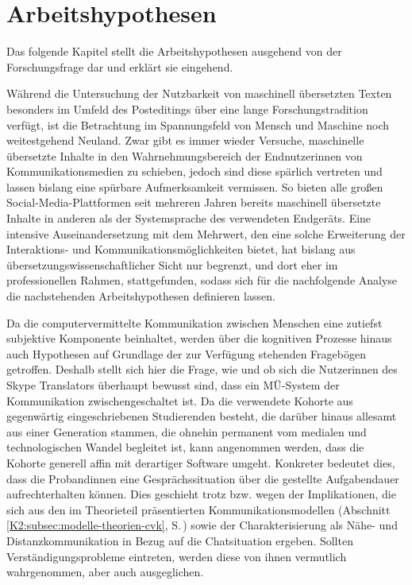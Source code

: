 \chapter{Arbeitshypothesen}\label{K4} %
\begin{sloppypar}
Das folgende Kapitel stellt die Arbeitshypothesen ausgehend von der Forschungsfrage dar und erklärt sie eingehend.
\end{sloppypar}

Während die Untersuchung der Nutzbarkeit von maschinell übersetzten Texten besonders im Umfeld des Posteditings über eine lange Forschungstradition verfügt, ist die Betrachtung im Spannungsfeld von Mensch und Maschine noch weitestgehend Neuland. Zwar gibt es immer wieder Versuche, maschinelle übersetzte Inhalte in den Wahrnehmungsbereich der Endnutzer{\textperiodcentered}innen von Kommunikationsmedien zu schieben, jedoch sind diese spärlich vertreten und lassen bislang eine spürbare Aufmerksamkeit vermissen. So bieten alle großen Social-Media-Plattformen seit mehreren Jahren bereits maschinell übersetzte Inhalte in anderen als der Systemsprache des verwendeten Endgeräts. Eine intensive Auseinandersetzung mit dem Mehrwert, den eine solche Erweiterung der Interaktions- und Kommunikationsmöglichkeiten bietet, hat bislang aus übersetzungswissenschaftlicher Sicht nur begrenzt, und dort eher im professionellen Rahmen, stattgefunden, sodass sich für die nachfolgende Analyse die nachstehenden Arbeitshypothesen definieren lassen. 

Da die computervermittelte Kommunikation zwischen Menschen eine zutiefst subjektive Komponente beinhaltet, werden über die kognitiven Prozesse hinaus auch Hypothesen auf Grundlage der zur Verfügung stehenden Fragebögen getroffen. Deshalb stellt sich hier die Frage, wie und ob sich die Nutzer{\textperiodcentered}innen des Skype Translators überhaupt bewusst sind, dass ein MÜ-System der Kommunikation zwischengeschaltet ist. Da die verwendete Kohorte aus gegenwärtig eingeschriebenen Studierenden besteht, die darüber hinaus allesamt aus einer Generation stammen, die ohnehin permanent vom medialen und technologischen Wandel begleitet ist, kann angenommen werden, dass die Kohorte generell affin mit derartiger Software umgeht. Konkreter bedeutet dies, dass die Proband{\textperiodcentered}innen eine Gesprächssituation über die gestellte Aufgabendauer aufrechterhalten können. Dies geschieht trotz bzw. wegen der Implikationen, die sich aus den im Theorieteil präsentierten Kommunikationsmodellen (Abschnitt \ref{K2:subsec:modelle-theorien-cvk}, S.\,\pageref{K2:subsec:modelle-theorien-cvk}) sowie der Charakterisierung als Nähe- und Distanzkommunikation in Bezug auf die Chatsituation ergeben. Sollten Verständigungsprobleme eintreten, werden diese von ihnen vermutlich wahrgenommen, aber auch ausgeglichen.  

